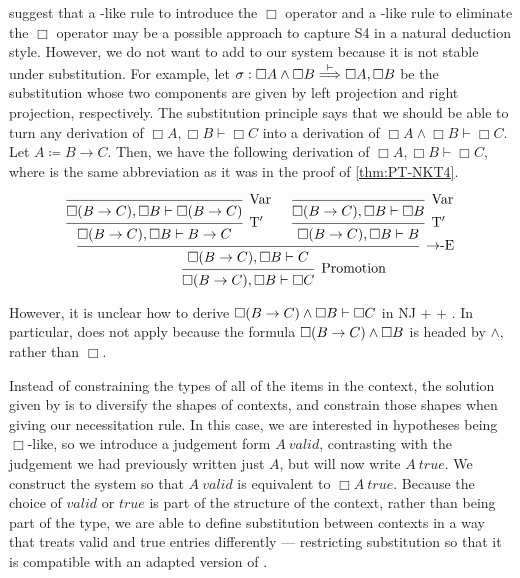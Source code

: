  suggest that a -like rule to
introduce the $\Box$ operator and a -like rule to eliminate the
$\Box$ operator may be a possible approach to capture S4 in a natural deduction
style.
However, we do not want to add  to our system because it is
not stable under substitution.
For example, let
$\sigma : \Box A \wedge \Box B \stackrel{\vdash}\Longrightarrow \Box A, \Box B$ be the substitution
whose two components are given by left projection and right projection,
respectively.
The substitution principle says that we should be able to turn any derivation of
$\Box A, \Box B \vdash \Box C$ into a derivation of
$\Box A \wedge \Box B \vdash \Box C$.
Let $A \coloneqq B \to C$.
Then, we have the following derivation of $\Box A, \Box B \vdash \Box C$, where
 is the same abbreviation as it was in the proof of
\cref{thm:PT-NKT4}.

\begin{displaymath}
  \begin{prooftree}
    \infer0[Var]{\Box\plr{B \to C}, \Box B \vdash \Box\plr{B \to C}}
    \infer1[T$'$]{\Box\plr{B \to C}, \Box B \vdash B \to C}
    \infer0[Var]{\Box\plr{B \to C}, \Box B \vdash \Box B}
    \infer1[T$'$]{\Box\plr{B \to C}, \Box B \vdash B}
    \infer2[$\to$-E]{\Box\plr{B \to C}, \Box B \vdash C}
    \infer1[Promotion]{\Box\plr{B \to C}, \Box B \vdash \Box C}
  \end{prooftree}
\end{displaymath}

However, it is unclear how to derive
$\Box\plr{B \to C} \wedge \Box B \vdash \Box C$ in NJ +  +
.
In particular,  does not apply because the formula
$\Box\plr{B \to C} \wedge \Box B$ is headed by $\wedge$, rather than $\Box$.

Instead of constraining the types of all of the items in the context, the
solution given by \citet{judgmental} is to diversify the shapes of contexts, and
constrain those shapes when giving our necessitation rule.
In this case, we are interested in hypotheses being $\Box$-like, so we introduce
a judgement form $A~\mathit{valid}$, contrasting with the judgement we had
previously written just $A$, but will now write $A~\mathit{true}$.
We construct the system so that $A~\mathit{valid}$ is equivalent to
$\Box A~\mathit{true}$.
Because the choice of $\mathit{valid}$ or $\mathit{true}$ is part of the
structure of the context, rather than being part of the type, we are able to
define substitution between contexts in a way that treats valid and true entries
differently --- restricting substitution so that it is compatible with an
adapted version of .

